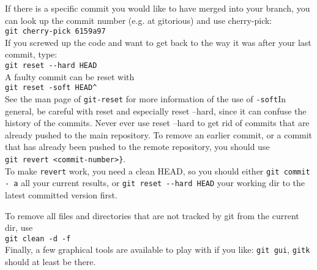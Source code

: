 \documentclass[a4paper,10pt]{article}
\begin{document}
If there is a specific commit you would like to have merged into your branch, you can look up the commit number (e.g. at gitorious) and use cherry-pick:\\
\verb|git cherry-pick 6159a97|\\
If you screwed up the code and want to get back to the way it was after your last commit, type:\\
\verb|git reset --hard HEAD|\\
A faulty commit can be reset with\\ \verb|git reset -soft HEAD^| \\
See the man page of \verb|git-reset| for more information of the use of \verb|-soft|In general, be careful with reset and especially reset --hard, since it can confuse the history of the commits. Never ever use reset --hard to get rid of commits that are already pushed to the main repository. To remove an earlier commit, or a commit that has already been pushed to the remote repository, you should use \\ \verb|git revert <commit-number>}|.\\ To make \verb|revert| work, you need a clean HEAD, so you should either \verb|git commit - a| all your current results, or \verb|git reset --hard HEAD| your working dir to the latest committed version first.


To remove all files and directories that are not tracked by git from the current dir, use\\ \verb|git clean -d -f|\\

Finally, a few graphical tools are available to play with if you like:  \verb|git gui|, \verb|gitk| should at least be there.
\end{document}
